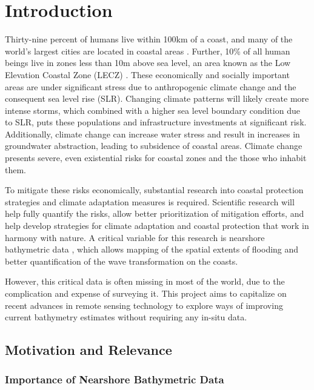 \chapter{Introduction}


Thirty-nine percent  of humans live within 100km of a coast, and many of the world's largest cities are located in coastal areas \parencite{Magdalena2021}. Further, 10\% of all human beings live in zones less than 10m above sea level, an area known as the Low Elevation Coastal Zone (LECZ) \parencite{Neumann2015,Lichter2011}. These economically and socially important areas are under significant stress due to anthropogenic climate change and the consequent sea level rise (SLR). Changing climate patterns will likely create more intense storms, which combined with a higher sea level boundary condition due to SLR, puts these populations and infrastructure investments at significant risk. Additionally, climate change can increase water stress and result in increases in groundwater abstraction, leading to subsidence of coastal areas. Climate change presents severe, even existential risks for coastal zones and the those who inhabit them.

To mitigate these risks economically, substantial research into coastal protection strategies and climate adaptation measures is required. Scientific research will help fully quantify the risks, allow better prioritization of mitigation efforts, and help develop strategies for climate adaptation and coastal protection that work in harmony with nature. A critical variable for this research is nearshore bathymetric data \parencite{Holman2013}, which allows mapping of the spatial extents of flooding and better quantification of the wave transformation on the coasts. 

However, this critical data is often missing in most of the world, due to the complication and expense of surveying it. This project aims to capitalize on recent advances in remote sensing technology to explore ways of improving current bathymetry estimates without requiring any in-situ data. 

\section{Motivation and Relevance}
\subsection{Importance of Nearshore Bathymetric Data}

